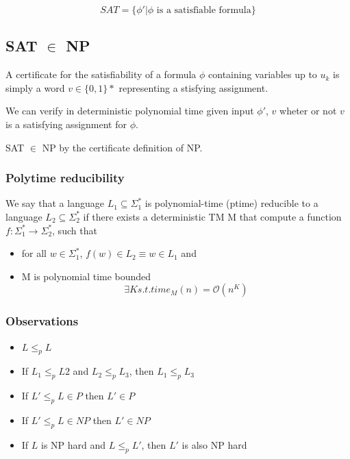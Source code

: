 \documentclass[a4paper,12pt]{article}
\theoremstyle{definition}
\theoremstyle{remark}
\begin{document}
\begin{equation*}
    SAT = \{\phi' | \phi \text{ is a satisfiable formula}\}
\end{equation*}

\subsection*{SAT $\in$ NP}

A certificate for the satisfiability of a formula $\phi$ containing variables up to $u_k$ is simply a word $v \in \{0, 1\}*$
representing a stisfying assignment.

We can verify in deterministic polynomial time given input $\phi'$, $v$ wheter or not $v$ is a satisfying assignment for $\phi$.

SAT $\in$ NP by the certificate definition of NP.

\subsubsection*{Polytime reducibility}
We say that a language $L_1 \subseteq \Sigma_1^*$ is polynomial-time (ptime) reducible to a language $L_2 \subseteq \Sigma_2^*$ if there exists
a deterministic TM M that compute a function $f: \Sigma_1^* \to \Sigma_2^*$, such that
\begin{itemize}
    \item for all $w \in \Sigma_1^*$, $f(w) \in L_2 \equiv w \in L_1$ and
    \item M is polynomial time bounded
    \begin{equation*}
        \exists K s.t. time_M(n) = \mathscr{O}(n^K)
    \end{equation*}
\end{itemize}

\subsubsection*{Observations}
\begin{itemize}
    \item $L \leq_p L$
    \item If $L_1 \leq_p L2$ and $L_2 \leq_p L_3$, then $L_1 \leq_p L_3$
    \item If $L' \leq_p L \in P$ then $L' \in P$
    \item If $L' \leq_p L \in NP$ then $L' \in NP$
    \item If $L$ is NP hard and $L \leq_p L'$, then $L'$ is also NP hard
\end{itemize}
\end{document}

